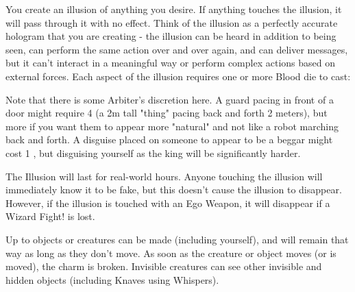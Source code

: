 \WIZARDRY[
  Name=Illusion,
  Link=secrets-illusion,
  Alignment=Mind,
  Save=N,
  Duration=Varies,
  Counter=\mylink{Ego Weapon}{secrets-ego-weapon} ,
  Keywords=None,
  Target=Varies
]

You create an illusion of anything you desire. If anything touches the illusion, it will pass through it with no effect.  Think of the illusion as a perfectly accurate hologram that you are creating - the illusion can be
heard in addition to being seen, can perform the same action over and over again, and can deliver messages, but it can't interact in a meaningful way
or perform complex actions based on external forces. Each aspect of the illusion requires one or more Blood die to cast:


Note that there is some Arbiter's discretion here.  A guard pacing in front of a door might require 4 \DICE (a 2m tall "thing" pacing back and forth 2 meters), but more if you want them to appear more "natural" and not like a robot marching back and forth.  A disguise placed on someone to appear to be a beggar might cost 1 \DICE, but disguising yourself as the king will be significantly harder.

The Illusion will last for \DICE real-world hours.  Anyone touching the illusion will immediately know it to be fake, but this doesn't cause the illusion to disappear.  However, if the illusion is touched with an Ego Weapon, it will disappear if a Wizard Fight! is lost.


\WIZARDRY[
  Name=Invisibility,
  Link=secrets-invisibility,
  Alignment=Entropy,
  Save=N,
  Duration=\DICE,
  Counter=\mylink{Fool's Fire}{secrets-fools-fire} ,
  Keywords=None,
  Target=Self or Close Allies or Objects
]

Up to \DICE objects or creatures can be made  (including yourself), and will remain that way as long as they don't move.  As soon as the creature or object moves (or is moved), the charm is broken.  Invisible creatures can see other invisible and hidden objects (including Knaves using Whispers).  

